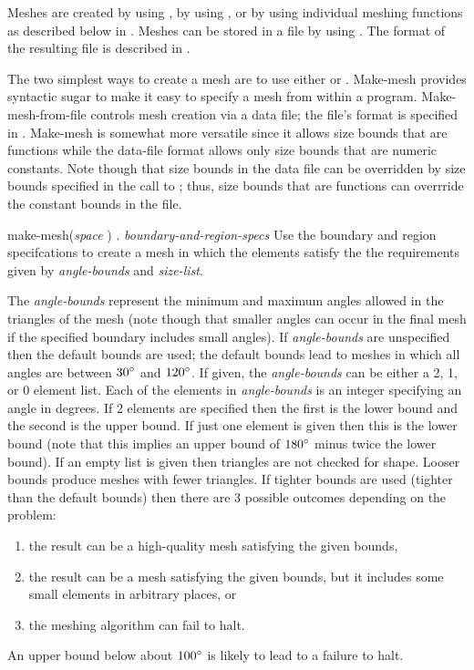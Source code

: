 Meshes are created by using , by using
, or by using individual meshing
functions as 
described below in .  Meshes can be
stored in a file by using .  The format of the
resulting file is described in .

The two simplest ways to create a mesh are to use either
 or .  {\sf Make-mesh}
provides syntactic sugar to make it easy to specify a mesh from within
a program.  {\sf Make-mesh-from-file} controls mesh creation via a
data file; the file's format is specified in .
{\sf Make-mesh} is somewhat more versatile since it allows size bounds
that are functions while the data-file format allows only size bounds
that are numeric constants.  Note though that size bounds in the data
file can be overridden by size bounds specified in the call to
; thus, size bounds that are functions
can overrride the constant bounds in the file.

\begin{macrodef}{make-mesh}{\rm ({\em space} ) . {\em boundary-and-region-specs}} 
Use the boundary and region specifcations to create a mesh in which the
elements satisfy the the requirements given by {\em angle-bounds} and
{\em size-list\/}.  
\end{macrodef}

The {\em angle-bounds} represent the minimum and maximum angles
allowed in the triangles of the mesh (note though that smaller angles
can occur in the final mesh if the specified boundary includes small
angles).  If {\em angle-bounds} are unspecified then the default
bounds are used; the default bounds lead to meshes in which all angles
are between $30^{\circ}$ and $120^{\circ}$.  If given, the {\em
angle-bounds} can be either a 2, 1, or 0 element list.  Each of the
elements in {\em angle-bounds} is an integer specifying an angle in
degrees.  If 2 elements are specified then the first is the lower
bound and the second is the upper bound.  If just one element is given
then this is the lower bound (note that this implies an upper bound of
$180^{\circ}$ minus twice the lower bound).  If an empty list is given
then triangles are not checked for shape.  Looser bounds produce
meshes with fewer triangles.  If tighter bounds are used (tighter than
the default bounds) then there are 3 possible outcomes depending on
the problem:
\begin{enumerate}
\item the result can be a high-quality mesh satisfying the given
bounds, 
\item the result can be a mesh satisfying the given bounds, but it includes some small elements
in arbitrary places, or 
\item the meshing algorithm can fail to halt.
\end{enumerate}
An upper bound below about $100^{\circ}$ is likely to lead to a failure
to halt.


